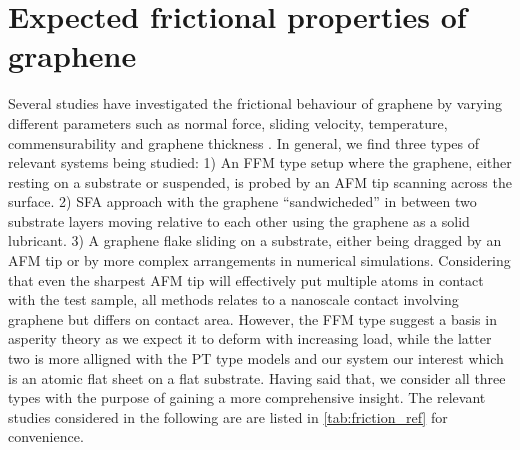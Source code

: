 





\section{Expected frictional properties of graphene}\label{sec:expected_prop}

Several studies have investigated the frictional behaviour of graphene by
varying different parameters such as normal force, sliding velocity,
temperature, commensurability and graphene thickness
\cite{penkov_tribology_2014}. In general, we find three types of relevant
systems being studied: 1) An \acrshort{FFM} type setup where the graphene,
either resting on a substrate or suspended, is probed by an \acrshort{AFM} tip
scanning across the surface. 2) \acrshort{SFA} approach with the graphene
``sandwicheded'' in between two substrate layers moving relative to each other
using the graphene as a solid lubricant. 3) A graphene flake sliding on a
substrate, either being dragged by an \acrshort{AFM} tip or by more complex
arrangements in numerical simulations. Considering that even the sharpest
\acrshort{AFM} tip will effectively put multiple atoms in contact with the test
sample, all methods relates to a nanoscale contact involving graphene but differs on contact area. However, the \acrshort{FFM} type suggest a basis in asperity theory as we expect it to deform with increasing load, while the latter two is more alligned with the \acrshort{PT} type models and our system our interest which is an atomic flat sheet on a flat substrate. Having said that, we consider all
three types with the purpose of gaining a more comprehensive insight. The relevant studies considered in the following are are listed in \cref{tab:friction_ref}
for convenience. 



